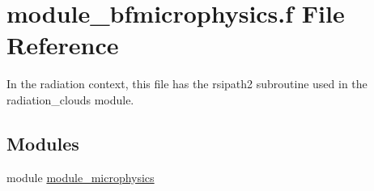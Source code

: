 \hypertarget{module__bfmicrophysics_8f}{}\section{module\+\_\+bfmicrophysics.\+f File Reference}
\label{module__bfmicrophysics_8f}


In the radiation context, this file has the rsipath2 subroutine used in the radiation\+\_\+clouds module.  


\subsection*{Modules}
\begin{DoxyCompactItemize}
\item 
module \hyperlink{namespacemodule__microphysics}{module\+\_\+microphysics}
\end{DoxyCompactItemize}
